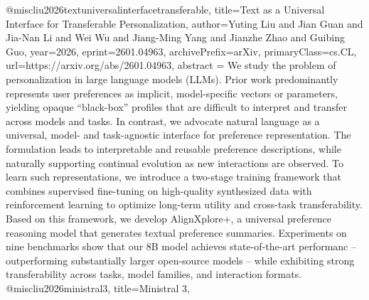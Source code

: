 {}@misc{liu2026textuniversalinterfacetransferable,
      title={Text as a Universal Interface for Transferable Personalization}, 
      author={Yuting Liu and Jian Guan and Jia-Nan Li and Wei Wu and Jiang-Ming Yang and Jianzhe Zhao and Guibing Guo},
      year={2026},
      eprint={2601.04963},
      archivePrefix={arXiv},
      primaryClass={cs.CL},
      url={https://arxiv.org/abs/2601.04963},
      abstract = {We study the problem of personalization in large language models (LLMs). Prior work predominantly represents user preferences as implicit, model-specific vectors or parameters, yielding opaque ``black-box'' profiles that are difficult to interpret and transfer across models and tasks. In contrast, we advocate natural language as a universal, model- and task-agnostic interface for preference representation. The formulation leads to interpretable and reusable preference descriptions, while naturally supporting continual evolution as new interactions are observed. To learn such representations, we introduce a two-stage training framework that combines supervised fine-tuning on high-quality synthesized data with reinforcement learning to optimize long-term utility and cross-task transferability. Based on this framework, we develop AlignXplore+, a universal preference reasoning model that generates textual preference summaries. Experiments on nine benchmarks show that our 8B model achieves state-of-the-art performanc -- outperforming substantially larger open-source models -- while exhibiting strong transferability across tasks, model families, and interaction formats.}
}@misc{liu2026ministral3,
      title={Ministral 3}, 
}
